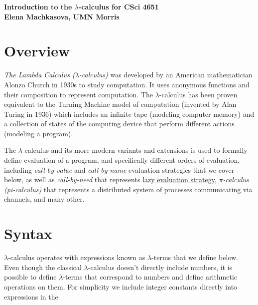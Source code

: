 \documentclass{article}
\newcommand{\lam}{\lambda}
\begin{document}



\begin{center}
{\large\bf Introduction to the $\lam$-calculus for CSci 4651}
\\ 
{\large\bf Elena Machkasova, UMN Morris}
\end{center}

\section{Overview}
\textit{The Lambda Calculus ($\lam$-calculus)} was developed by an American mathematician Alonzo Church in 1930s to study computation. 
It uses anonymous functions and their composition to represent computation. The $\lam$-calculus has been proven equivalent to 
the Turning Machine model of computation (invented by Alan Turing in 1936) which includes an infinite tape (modeling computer memory) and a collection of states of the computing device that perform different actions (modeling a program). 

The $\lam$-calculus and its more modern variants and extensions is used to formally define evaluation of a program, and 
specifically different orders of evaluation, including \textit{call-by-value} and \textit{call-by-name} evaluation strategies that we cover below, 
as well as \textit{call-by-need} that represents \href{https://en.wikipedia.org/wiki/Lazy_evaluation}{lazy evaluation strategy}, 
\textit{$\pi$-calculus (pi-calculus)} that represents a distributed system of processes communicating via channels, and many other. 

\section{Syntax}

$\lam$-calculus operates with expressions known as $\lam$-terms that we define below. 
Even though the classical $\lam$-calculus doesn't directly include numbers, it is possible to define $\lam$-terms 
that correspond to numbers and define
arithmetic operations on them. For simplicity we include integer constants directly into expressions in the 
\end{document}
